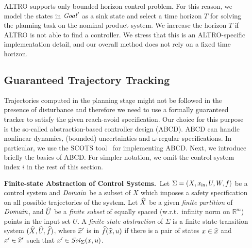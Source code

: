 \begin{remark}
	ALTRO supports only bounded horizon control problem.
	For this reason, we model the states in $\mathit{Goal}'$ as a sink state and select a time horizon $T$ for solving the planning task on the nominal product system. We increase the horizon $T$ if ALTRO is not able to find a controller.
	We stress that this is an ALTRO-specific implementation detail, and our overall method does not rely on a fixed time horizon.
\end{remark}



\subsection{Guaranteed Trajectory Tracking} 

Trajectories computed in the planning stage might not be followed in the presence of disturbance and therefore we need to use a 
formally guaranteed tracker to satisfy the given reach-avoid specification. 
Our choice for this purpose is the so-called abstraction-based controller design (ABCD). 
ABCD can handle nonlinear dynamics, (bounded) uncertainties and $\omega$-regular specifications. In particular, we use the SCOTS tool~\cite{Rungger2016scots} 
for implementing ABCD. Next, we introduce briefly the basics of ABCD.
For simpler notation, we omit the control system index $i$ in the rest of this section.


\smallskip
\noindent\textbf{Finite-state Abstraction of Control Systems.}\
Let $\Sigma = (X,x_{\mathsf{in}}, U, W, f)$ be a control system and $\mathit{Domain}$ be a subset of $X$ which imposes a safety specification on all possible trajectories of the system. Let $\widehat{X}$ be a given \emph{finite partition} of $\mathit{Domain}$, and $\widehat{U}$ be a \emph{finite subset} of equally spaced (w.r.t.\ infinity norm on $\mathbb{R}^m$) points in the input set $U$.
A \emph{finite-state abstraction} of $\Sigma$ is a finite state-transition system $(\widehat{X},\widehat{U},\widehat{f})$, where $\widehat{x}'$ is in $\widehat{f}(\widehat{x},u)$ if there is a pair of states $x\in \widehat{x}$ and $x'\in \widehat{x}'$ such that $x'\in \mathit{Sol}_\Sigma(x,u)$.

